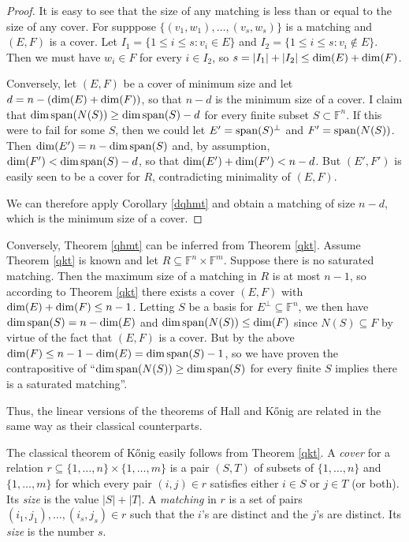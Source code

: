 \documentclass{amsart}
\theoremstyle{definition}
\begin{document}
\begin{proof}
It is easy to see that the size of any matching is less than or equal to the size of any cover. For supppose $\{(v_1, w_1), \ldots, (v_s, w_s)\}$ is a matching and $(E,F)$ is a cover. Let $I_1 = \{1 \leq i \leq s: v_i \in E\}$ and $I_2 = \{1 \leq i \leq s: v_i \not\in E\}$. Then we must have $w_i \in F$ for every $i \in I_2$, so $s = |I_1| + |I_2| \leq {\rm dim}(E) + {\rm dim}(F)$.

Conversely, let $(E,F)$ be a cover of minimum size and let $d = n - ({\rm dim}(E) + {\rm dim}(F))$, so that $n - d$ is the minimum size of a cover. I claim that ${\rm dim}\, {\rm span}(N(S)) \geq {\rm dim}\, {\rm span}(S) - d$ for every finite subset $S \subset \mathbb{F}^n$. If this were to fail for some $S$, then we could let $E' = {\rm span}(S)^\perp$ and $F' = {\rm span}(N(S))$. Then ${\rm dim}(E') = n - {\rm dim}\, {\rm span}(S)$ and, by assumption, ${\rm dim}(F') < {\rm dim}\, {\rm span}(S) - d$, so that
${\rm dim}(E') + {\rm dim}(F') < n-d$. But $(E',F')$ is easily seen to be a cover for $R$, contradicting minimality of $(E,F)$.

We can therefore apply Corollary \ref{dqhmt} and obtain a matching of size $n - d$, which is the minimum size of a cover.
\end{proof}

Conversely, Theorem \ref{qhmt} can be inferred from Theorem \ref{qkt}. Assume Theorem \ref{qkt} is known and let $R \subseteq \mathbb{F}^n \times \mathbb{F}^m$. Suppose there is no saturated matching. Then the maximum size of a matching in $R$ is at most $n - 1$, so according to Theorem \ref{qkt} there exists a cover $(E,F)$ with ${\rm dim}(E) + {\rm dim}(F) \leq n - 1$. Letting $S$ be a basis for $E^\perp \subseteq \mathbb{F}^n$, we then have ${\rm dim}\, {\rm span}(S) = n - {\rm dim}(E)$ and ${\rm dim}\, {\rm span}(N(S)) \leq {\rm dim}(F)$ since $N(S) \subseteq F$ by virtue of the fact that $(E,F)$ is a cover. But by the above ${\rm dim}(F) \leq n - 1 - {\rm dim}(E) = {\rm dim}\, {\rm span}(S) - 1$, so we have proven the contrapositive of ``${\rm dim}\, {\rm span}(N(S)) \geq {\rm dim}\, {\rm span}(S)$ for every finite $S$ implies there is a saturated matching''.

Thus, the linear versions of the theorems of Hall and Kőnig are related in the same way as their classical counterparts.

The classical theorem of Kőnig easily follows from Theorem \ref{qkt}. A {\it cover} for a relation $r \subseteq \{1, \ldots, n\} \times \{1, \ldots, m\}$ is a pair $(S, T)$ of subsets of $\{1, \ldots, n\}$ and $\{1, \ldots, m\}$ for which every pair $(i,j) \in r$ satisfies either $i \in S$ or $j \in T$ (or both). Its {\it size} is the value $|S| + |T|$. A {\it matching} in $r$ is a set of pairs $(i_1, j_1), \ldots, (i_s, j_s) \in r$ such that the $i$'s are distinct and the $j$'s are distinct. Its {\it size} is the number $s$.
\end{document}
